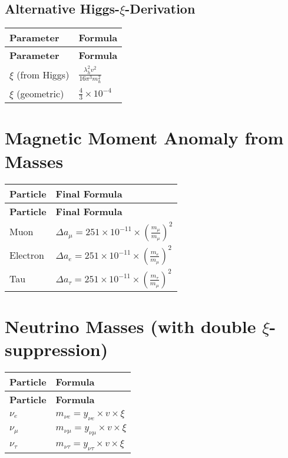 \documentclass[12pt,a4paper]{article}
\begin{document}
	\subsection{Alternative Higgs-\(\xi\)-Derivation}
	
	\begin{longtable}{|p{3cm}|p{5cm}|}
		\hline
		\textbf{Parameter} & \textbf{Formula} \\
		\hline
		\endfirsthead
		\hline
		\textbf{Parameter} & \textbf{Formula} \\
		\hline
		\endhead
		\(\xi\) (from Higgs) & \(\frac{\lambda_h^{2}v^{2}}{16\pi^{3}m_h^{2}}\) \\
		\hline
		\(\xi\) (geometric) & \(\frac{4}{3} \times 10^{-4}\) \\
		\hline
	\end{longtable}
	
	\section{Magnetic Moment Anomaly from Masses}
	
	\begin{longtable}{|p{2.5cm}|p{4.5cm}|}
		\hline
		\textbf{Particle} & \textbf{Final Formula} \\
		\hline
		\endfirsthead
		\hline
		\textbf{Particle} & \textbf{Final Formula} \\
		\hline
		\endhead
		Muon & \(\Delta a_{\mu} = 251 \times 10^{-11} \times \left(\frac{m_{\mu}}{m_{\mu}}\right)^{2}\) \\
		\hline
		Electron & \(\Delta a_{e} = 251 \times 10^{-11} \times \left(\frac{m_{e}}{m_{\mu}}\right)^{2}\) \\
		\hline
		Tau & \(\Delta a_{\tau} = 251 \times 10^{-11} \times \left(\frac{m_{\tau}}{m_{\mu}}\right)^{2}\) \\
		\hline
	\end{longtable}
	
	\section{Neutrino Masses (with double \(\xi\)-suppression)}
	
	\begin{longtable}{|p{3cm}|p{4cm}|}
		\hline
		\textbf{Particle} & \textbf{Formula} \\
		\hline
		\endfirsthead
		\hline
		\textbf{Particle} & \textbf{Formula} \\
		\hline
		\endhead
		\(\nu_e\) & \(m_{\nu e} = y_{\nu e} \times v \times \xi\) \\
		\hline
		\(\nu_{\mu}\) & \(m_{\nu \mu} = y_{\nu \mu} \times v \times \xi\) \\
		\hline
		\(\nu_{\tau}\) & \(m_{\nu \tau} = y_{\nu \tau} \times v \times \xi\) \\
		\hline
	\end{longtable}
	
\end{document}
